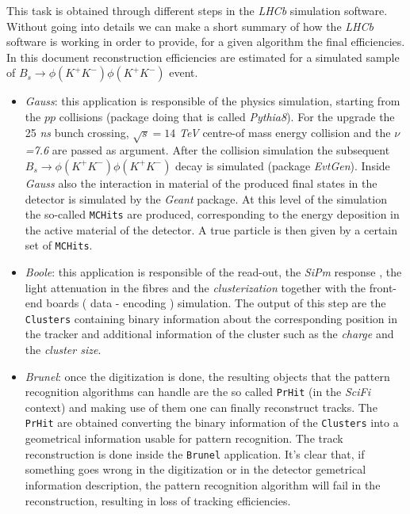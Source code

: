 \documentclass[paper=a4, fontsize=10pt]{scrartcl}
\numberwithin{equation}{section}		%
\numberwithin{figure}{section}			%
\numberwithin{table}{section}				%
\begin{document}
This task is obtained through different steps in the \textit{LHCb} simulation software. 
Without going into details we can make a short summary of how the \textit{LHCb} software is working in order to provide, for a given algorithm the final efficiencies. In this document reconstruction efficiencies are estimated for a simulated sample of  $B_s\rightarrow \phi\left( K^{+}K^{-}\right) \phi \left( K^{+}K^{-} \right)$ event.
\begin{itemize}
  \item{\textit{Gauss}: this application is responsible of the physics simulation, starting from the $pp$ collisions (package doing that is called \textit{Pythia8}). For the upgrade the 25 \textit{ns} bunch crossing, $\sqrt{s}= 14$ \textit{TeV} centre-of mass energy collision and the $\nu$\textit{=7.6} are passed as argument. After the collision simulation the subsequent $B_s\rightarrow \phi\left( K^{+}K^{-}\right) \phi \left(K^{+} K^{-} \right)$ decay is simulated (package \textit{EvtGen}).
 Inside \textit{Gauss} also the interaction in material of the produced final states in the detector is simulated by the \textit{Geant} package. At this level of the simulation the so-called \texttt{MCHits} are produced, corresponding to the energy deposition in the active material of the detector. A true particle is then given by a certain set of \texttt{MCHits}.}
\item{\textit{Boole}: this application is responsible of the read-out, the \textit{SiPm} response , the light attenuation in the fibres and the \textit{clusterization} together with the front-end boards ( data - encoding ) simulation. The output of this step are the \texttt{Clusters} containing binary information about the corresponding position in the tracker and additional information of the cluster such as the \textit{charge} and the \textit{cluster size}.}
\item{\textit{Brunel}: once the digitization is done, the resulting objects that the pattern recognition algorithms can handle are the so called \texttt{PrHit} (in the \textit{SciFi} context) and making use of them one can finally reconstruct tracks. The \texttt{PrHit} are obtained converting the binary information of the \texttt{Clusters} into a geometrical information usable for pattern recognition. The track reconstruction is done inside the \texttt{Brunel} application. It's clear that, if something goes wrong in the digitization or in the detector gemetrical information description, the pattern recognition algorithm will fail in the reconstruction, resulting in loss of tracking efficiencies.}

\end{itemize}
\end{document}
